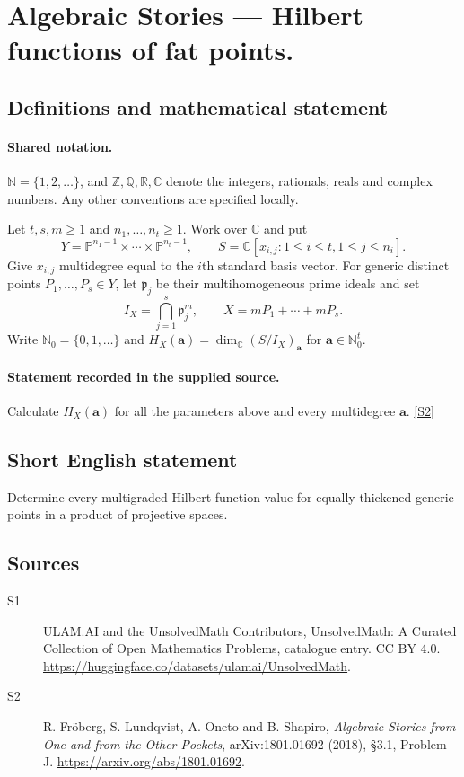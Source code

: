 \documentclass[11pt]{article}
\newcommand{\sref}[2]{\hyperlink{source:#1:#2}{[S#2]}}
\begin{document}
\section{Algebraic Stories — Hilbert functions of fat points.}\label{statement}

\subsection{Definitions and mathematical statement}

\paragraph{Shared notation.}$\mathbb N=\{1,2,\ldots\}$, and $\mathbb Z,\mathbb Q,\mathbb R,\mathbb C$ denote the integers, rationals, reals and complex numbers. Any other conventions are specified locally.


Let $t,s,m\geq1$ and $n_1,\ldots,n_t\geq1$. Work over $\mathbb C$ and put
\[Y=\mathbb P^{n_1-1}\times\cdots\times\mathbb P^{n_t-1},\qquad
S=\mathbb C[x_{i,j}:1\leq i\leq t,1\leq j\leq n_i].
\]
Give $x_{i,j}$ multidegree equal to the $i$th standard basis vector. For generic distinct points $P_1,\ldots,P_s\in Y$, let $\mathfrak p_j$ be their multihomogeneous prime ideals and set
\[I_X=\bigcap_{j=1}^s\mathfrak p_j^m,\qquad X=mP_1+\cdots+mP_s.
\]
Write $\mathbb N_0=\{0,1,\ldots\}$ and $H_X(\boldsymbol a)=\dim_{\mathbb C}(S/I_X)_{\boldsymbol a}$ for $\boldsymbol a\in\mathbb N_0^t$.
\paragraph{Statement recorded in the supplied source.}
Calculate $H_X(\boldsymbol a)$ for all the parameters above and every multidegree $\boldsymbol a$. \sref{statement}{2}
\subsection{Short English statement}
Determine every multigraded Hilbert-function value for equally thickened generic points in a product of projective spaces.
\subsection{Sources}
\begin{description}
\item[\hypertarget{source:statement:1}{S1}] ULAM.AI and the UnsolvedMath Contributors, UnsolvedMath: A Curated Collection of Open Mathematics Problems, catalogue entry. CC BY 4.0. \url{https://huggingface.co/datasets/ulamai/UnsolvedMath}.
\item[\hypertarget{source:statement:2}{S2}] R. Fröberg, S. Lundqvist, A. Oneto and B. Shapiro, \emph{Algebraic Stories from One and from the Other Pockets}, arXiv:1801.01692 (2018), §3.1, Problem J. \url{https://arxiv.org/abs/1801.01692}.
\end{description}
\label{end:statement}
\end{document}
